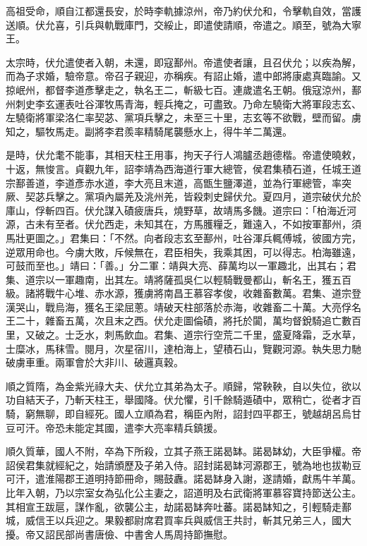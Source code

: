 \begin{pinyinscope}
 高祖受命，順自江都還長安，於時李軌據涼州，帝乃約伏允和，令擊軌自效，當護送順。伏允喜，引兵與軌戰庫門，交綏止，即遣使請順，帝遣之。順至，號為大寧王。



 太宗時，伏允遣使者入朝，未還，即寇鄯州。帝遣使者讓，且召伏允；以疾為解，而為子求婚，驗帝意。帝召子親迎，亦稱疾。有詔止婚，遣中郎將康處真臨諭。又掠岷州，都督李道彥擊走之，執名王二，斬級七百。連歲遣名王朝。俄寇涼州，鄯州刺史李玄運表吐谷渾牧馬青海，輕兵掩之，可盡致。乃命左驍衛大將軍段志玄、左驍衛將軍梁洛仁率契苾、黨項兵擊之，未至三十里，志玄等不欲戰，壁而留。虜知之，驅牧馬走。副將李君羨率精騎尾襲懸水上，得牛羊二萬還。



 是時，伏允耄不能事，其相天柱王用事，拘天子行人鴻臚丞趙德楷。帝遣使曉敕，十返，無悛言。貞觀九年，詔李靖為西海道行軍大總管，侯君集積石道，任城王道宗鄯善道，李道彥赤水道，李大亮且末道，高甑生鹽澤道，並為行軍總管，率突厥、契苾兵擊之。黨項內屬羌及洮州羌，皆殺刺史歸伏允。夏四月，道宗破伏允於庫山，俘斬四百。伏允謀入磧疲唐兵，燒野草，故靖馬多饑。道宗曰：「柏海近河源，古未有至者。伏允西走，未知其在，方馬臒糧乏，難遠入，不如按軍鄯州，須馬壯更圖之。」君集曰：「不然。向者段志玄至鄯州，吐谷渾兵輒傅城，彼國方完，逆眾用命也。今虜大敗，斥候無在，君臣相失，我乘其困，可以得志。柏海雖遠，可鼓而至也。」靖曰：「善。」分二軍：靖與大亮、薛萬均以一軍趣北，出其右；君集、道宗以一軍趣南，出其左。靖將薩孤吳仁以輕騎戰曼都山，斬名王，獲五百級。諸將戰牛心堆、赤水源，獲虜將南昌王慕容孝俊，收雜畜數萬。君集、道宗登漢哭山，戰烏海，獲名王梁屈蔥。靖破天柱部落於赤海，收雜畜二十萬。大亮俘名王二十，雜畜五萬，次且末之西。伏允走圖倫磧，將托於闐，萬均督銳騎追亡數百里，又破之。士乏水，刺馬飲血。君集、道宗行空荒二千里，盛夏降霜，乏水草，士糜冰，馬秣雪。閱月，次星宿川，達柏海上，望積石山，覽觀河源。執失思力馳破虜車重。兩軍會於大非川、破邏真穀。



 順之質隋，為金紫光祿大夫、伏允立其弟為太子。順歸，常鞅鞅，自以失位，欲以功自結天子，乃斬天柱王，舉國降。伏允懼，引千餘騎遁磧中，眾稍亡，從者才百騎，窮無聊，即自經死。國人立順為君，稱臣內附，詔封四平郡王，號越胡呂烏甘豆可汗。帝恐未能定其國，遣李大亮率精兵鎮援。



 順久質華，國人不附，卒為下所殺，立其子燕王諾曷缽。諾曷缽幼，大臣爭權。帝詔侯君集就經紀之，始請頒歷及子弟入侍。詔封諾曷缽河源郡王，號為地也拔勒豆可汗，遣淮陽郡王道明持節冊命，賜鼓纛。諾曷缽身入謝，遂請婚，獻馬牛羊萬。比年入朝，乃以宗室女為弘化公主妻之，詔道明及右武衛將軍慕容寶持節送公主。其相宣王跋扈，謀作亂，欲襲公主，劫諾曷缽奔吐蕃。諾曷缽知之，引輕騎走鄯城，威信王以兵迎之。果毅都尉席君買率兵與威信王共討，斬其兄弟三人，國大擾。帝又詔民部尚書唐儉、中書舍人馬周持節撫慰。




\end{pinyinscope}
